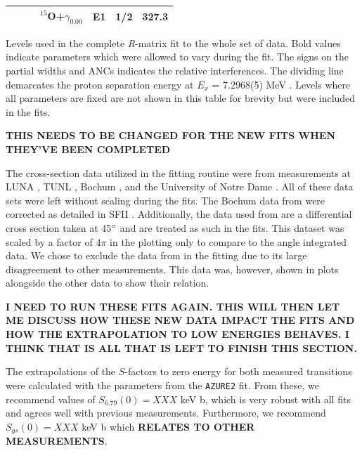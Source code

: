 \begin{table}[]
\begin{center}
\begin{threeparttable}
\begin{tabular}{c  c  c  c  c  c  c}
	&	&	&	$^{15}$O+$\gamma_{0.00}$	&	E1	&	1/2	&	\textbf{327.3}	\\
\bottomrule
\end{tabular}
\begin{tablenotes}
\small 
\item Levels used in the complete \textit{R}-matrix fit to the whole set of data. Bold values indicate parameters which were allowed to vary during the fit. The signs on the partial widths and ANCs indicates the relative interferences. The dividing line demarcates the proton separation energy at $E_x$ = 7.2968(5) MeV \cite{Ajzenberg-Selove1991}. Levels where all parameters are fixed are not shown in this table for brevity but were included in the fits.
\item \textbf{THIS NEEDS TO BE CHANGED FOR THE NEW FITS WHEN THEY'VE BEEN COMPLETED}
\end{tablenotes}
\end{threeparttable}
\label{table: fitParams}
\end{center}
\end{table}  



The cross-section data utilized in the fitting routine were from measurements at LUNA \cite{Formicola2004, Imbriani2005, Marta2008, Marta2011}, TUNL \cite{Runkle2005}, Bochum \cite{Schroder1987}, and the University of Notre Dame \cite{Li2016}. All of these data sets were left without scaling during the fits. The Bochum data from \citet{Schroder1987} were corrected as detailed in SFII \cite{Adelberger2011}. Additionally, the data used from \citet{Li2016} are a differential cross section taken at 45$\degree$ and are treated as such in the fits. This dataset was scaled by a factor of 4$\pi$ in the plotting only to compare to the angle integrated data. We chose to exclude the data from \citet{Wagner2018} in the fitting due to its large disagreement to other measurements. This data was, however, shown in plots alongside the other data to show their relation.


\textbf{I NEED TO RUN THESE FITS AGAIN. THIS WILL THEN LET ME DISCUSS HOW THESE NEW DATA IMPACT THE FITS AND HOW THE EXTRAPOLATION TO LOW ENERGIES BEHAVES. I THINK THAT IS ALL THAT IS LEFT TO FINISH THIS SECTION.}

The extrapolations of the $S$-factors to zero energy for both measured transitions were calculated with the parameters from the \texttt{AZURE2} fit. From these, we recommend values of $S_{6.79}(0) = XXX$ keV b, which is very robust with all fits and agrees well with previous measurements. Furthermore, we recommend $S_{gs}(0) = XXX$ keV b which \textbf{RELATES TO OTHER MEASUREMENTS}. 


%
% 
% 
